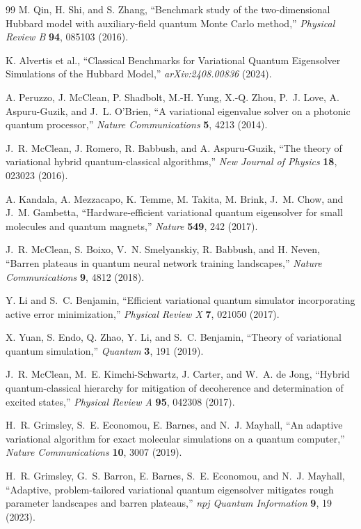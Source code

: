 \documentclass[
  reprint,
  amsmath,
  amssymb,
  aps,
  pra,
  nofootinbib,
  superscriptaddress,
  floatfix
]{revtex4-2}
\begin{document}
\begin{thebibliography}{99}
M. Qin, H. Shi, and S. Zhang,
``Benchmark study of the two-dimensional Hubbard model with auxiliary-field quantum Monte Carlo method,''
\emph{Physical Review B} \textbf{94}, 085103 (2016).

K. Alvertis et al.,
``Classical Benchmarks for Variational Quantum Eigensolver Simulations of the Hubbard Model,''
\emph{arXiv:2408.00836} (2024).

A. Peruzzo, J. McClean, P. Shadbolt, M.-H. Yung, X.-Q. Zhou, P.~J. Love, A. Aspuru-Guzik, and J.~L. O'Brien,
``A variational eigenvalue solver on a photonic quantum processor,''
\emph{Nature Communications} \textbf{5}, 4213 (2014).

J.~R. McClean, J. Romero, R. Babbush, and A. Aspuru-Guzik,
``The theory of variational hybrid quantum-classical algorithms,''
\emph{New Journal of Physics} \textbf{18}, 023023 (2016).

A. Kandala, A. Mezzacapo, K. Temme, M. Takita, M. Brink, J.~M. Chow, and J.~M. Gambetta,
``Hardware-efficient variational quantum eigensolver for small molecules and quantum magnets,''
\emph{Nature} \textbf{549}, 242 (2017).

J.~R. McClean, S. Boixo, V.~N. Smelyanskiy, R. Babbush, and H. Neven,
``Barren plateaus in quantum neural network training landscapes,''
\emph{Nature Communications} \textbf{9}, 4812 (2018).

Y. Li and S.~C. Benjamin,
``Efficient variational quantum simulator incorporating active error minimization,''
\emph{Physical Review X} \textbf{7}, 021050 (2017).

X. Yuan, S. Endo, Q. Zhao, Y. Li, and S.~C. Benjamin,
``Theory of variational quantum simulation,''
\emph{Quantum} \textbf{3}, 191 (2019).

J.~R. McClean, M.~E. Kimchi-Schwartz, J. Carter, and W.~A. de Jong,
``Hybrid quantum-classical hierarchy for mitigation of decoherence and determination of excited states,''
\emph{Physical Review A} \textbf{95}, 042308 (2017).

H.~R. Grimsley, S.~E. Economou, E. Barnes, and N.~J. Mayhall,
``An adaptive variational algorithm for exact molecular simulations on a quantum computer,''
\emph{Nature Communications} \textbf{10}, 3007 (2019).

H.~R. Grimsley, G.~S. Barron, E. Barnes, S.~E. Economou, and N.~J. Mayhall,
``Adaptive, problem-tailored variational quantum eigensolver mitigates rough parameter landscapes and barren plateaus,''
\emph{npj Quantum Information} \textbf{9}, 19 (2023).


\end{thebibliography}
\end{document}
